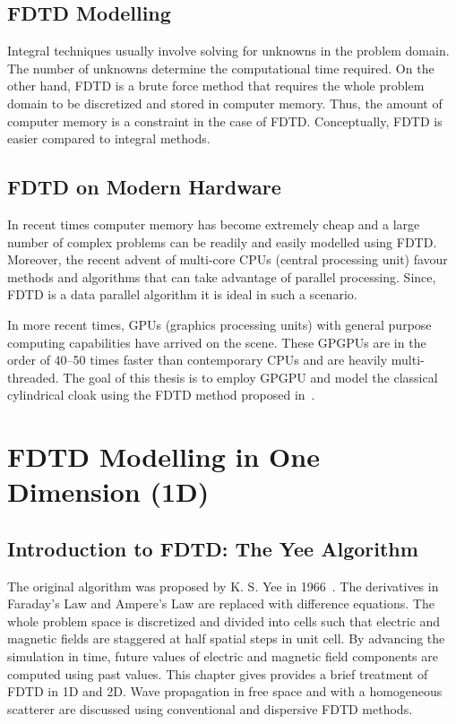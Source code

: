 \documentclass{report}
\begin{document}
\section{FDTD Modelling}
Integral techniques usually involve solving for unknowns in the problem domain. The number of unknowns determine the computational time required. On the other hand, FDTD is a brute force method that requires the whole problem domain to be discretized and stored in computer memory. Thus, the amount of computer memory is a constraint in the case of FDTD. Conceptually, FDTD is easier compared to integral methods.

\section{FDTD on Modern Hardware}
In recent times computer memory has become extremely cheap and a large number of complex problems can be readily and easily modelled using FDTD. Moreover, the recent advent of multi-core CPUs (central processing unit) favour methods and algorithms that can take advantage of parallel processing. Since, FDTD is a data parallel algorithm it is ideal in such a scenario.

In more recent times, GPUs (graphics processing units) with general purpose computing capabilities have arrived on the scene. These GPGPUs are in the order of 40--50 times faster than contemporary CPUs and are heavily multi-threaded. The goal of this thesis is to employ GPGPU and model the classical cylindrical cloak using the FDTD method proposed in~\cite{Radial-Zhao}.

\chapter{FDTD Modelling in One Dimension (1D)}

\section{Introduction to FDTD: The Yee Algorithm}

The original algorithm was proposed by K. S. Yee in 1966~\cite{Yee1966}. The derivatives in Faraday's Law and Ampere's Law are replaced with difference equations. The whole problem space is discretized and divided into cells such that electric and magnetic fields are staggered at half spatial steps in unit cell. By advancing the simulation in time, future values of electric and magnetic field components are computed using past values. This chapter gives provides a brief treatment of FDTD in 1D and 2D. Wave propagation in free space and with a homogeneous scatterer are discussed using conventional and dispersive FDTD methods.
\end{document}
